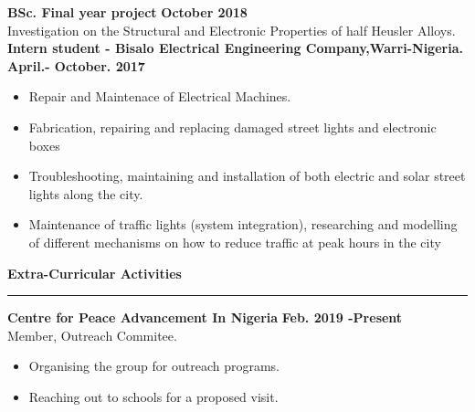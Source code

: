\documentclass[a4paper]{article}
\begin{document}
	
	\vspace{2.5mm}
	\noindent \textbf{BSc. Final year project}  \qquad \quad \qquad \qquad \qquad \qquad \qquad \qquad \qquad \qquad \qquad \quad \quad \quad \quad \quad\quad \quad \quad \textbf{October 2018 } 
	\\
     Investigation on the Structural and Electronic Properties of half Heusler Alloys.\\
    
     
	\noindent \textbf{Intern student - Bisalo Electrical Engineering Company,Warri-Nigeria.}   \quad \textbf{April.- October. 2017} 
	
	\begin{itemize}
		\item Repair and Maintenace of Electrical Machines.
		\item Fabrication, repairing and replacing damaged street lights and electronic boxes
		\item Troubleshooting, maintaining and installation of both electric and solar street lights along the city.
		\item Maintenance of traffic lights (system integration), researching and modelling of different mechanisms on how to reduce traffic at peak hours in the city
	\end{itemize}
	
	
	\noindent \textbf{Extra-Curricular Activities}
	\\
	\vspace{-2.8mm}
	\hrule 
	\vspace{2.5mm}
	
	\noindent \textbf{Centre for Peace Advancement In Nigeria}    \qquad \qquad \qquad \qquad \qquad \qquad \qquad \qquad \textbf{Feb. 2019 -Present}\\ Member, Outreach Commitee.
	\begin{itemize}
		\item Organising the group for outreach programs.
		\item Reaching out to schools for a proposed visit.
		
	\end{itemize}
	
\end{document}
